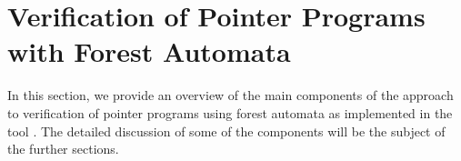 
\section{Verification of Pointer Programs with Forest
Automata}\label{sec:verification}
In this section, we provide an overview of the main components of the approach to verification of pointer programs using forest automata as implemented in the tool \forester.
The detailed discussion of some of the components will be the subject of the further sections.

